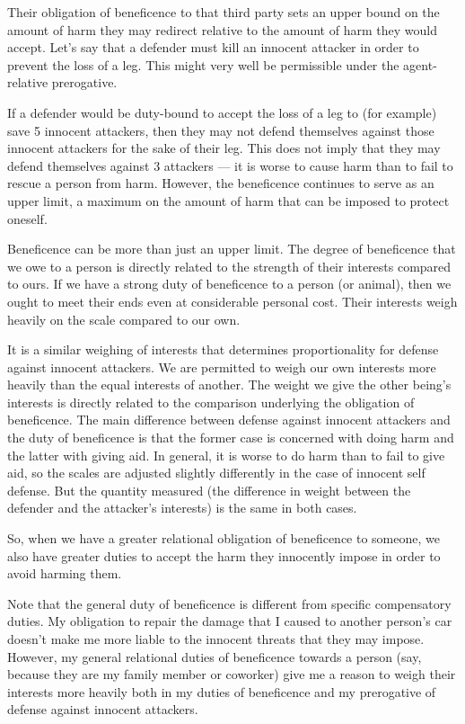 \documentclass[12pt]{book}
\begin{document}
		Their obligation of beneficence to that third party sets an upper bound
		on the amount of harm they may redirect relative to the amount of harm
		they would accept. Let’s say that a defender must kill an innocent
		attacker in order to prevent the loss of a leg. This might very well
		be permissible under the agent-relative prerogative.

		If a defender would be duty-bound to accept the loss of a leg to (for
		example) save 5 innocent attackers, then they may not defend themselves
		against those innocent attackers for the sake of their leg. This does
		not imply that they may defend themselves against 3 attackers --- it is
		worse to cause harm than to fail to rescue a person from harm. However,
		the beneficence continues to serve as an upper limit, a maximum on the
		amount of harm that can be imposed to protect oneself.

		Beneficence can be more than just an upper limit. The degree of
		beneficence that we owe to a person is directly related to the strength
		of their interests compared to ours. If we have a strong duty of
		beneficence to a person (or animal), then we ought to meet their ends
		even at considerable personal cost. Their interests weigh heavily on
		the scale compared to our own. 

		It is a similar weighing of interests that determines proportionality
		for defense against innocent attackers. We are permitted to weigh our
		own interests more heavily than the equal interests of another. The
		weight we give the other being’s interests is directly related to the
		comparison underlying the obligation of beneficence. The main difference
		between defense against innocent attackers and the duty of beneficence
		is that the former case is concerned with doing harm and the latter
		with giving aid. In general, it is worse to do harm than to fail to
		give aid, so the scales are adjusted slightly differently in the case
		of innocent self defense. But the quantity measured (the difference in
		weight between the defender and the attacker’s interests) is the same
		in both cases.

		So, when we have a greater relational obligation of beneficence to
		someone, we also have greater duties to accept the harm they innocently
		impose in order to avoid harming them.

		Note that the general duty of beneficence is different from specific
		compensatory duties. My obligation to repair the damage that I caused
		to another person’s car doesn’t make me more liable to the innocent
		threats that they may impose. However, my general relational duties
		of beneficence towards a person (say, because they are my family member
		or coworker) give me a reason to weigh their interests more heavily both
		in my duties of beneficence and my prerogative of defense against
		innocent attackers.
\end{document}

